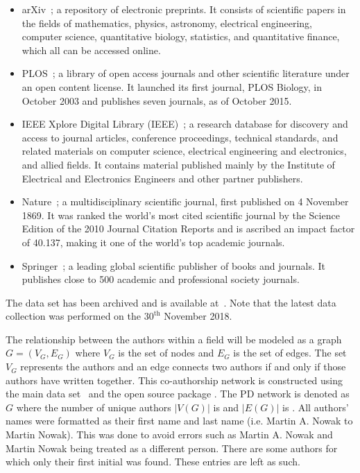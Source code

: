 \documentclass{article}
\theoremstyle{definition}
\newcommand{\authors}{}
\newcommand{\edges}{}
\begin{document}
\begin{multicols}{2}
    \begin{itemize}
        \item arXiv~\cite{mckiernan2000}; a repository of electronic preprints.
        It consists of scientific
        papers in the fields of mathematics, physics, astronomy, electrical engineering,
        computer science, quantitative biology, statistics, and quantitative finance,
        which all can be accessed online.
        \item PLOS~\cite{plos}; a library of open access journals and other scientific literature
        under an open content license. It launched its first journal, PLOS Biology,
        in October 2003 and publishes seven journals, as of October 2015.
        \item IEEE Xplore Digital Library (IEEE)~\cite{ieee}; a research database for discovery
        and access to journal articles, conference proceedings, technical standards,
        and related materials on computer science, electrical engineering and electronics,
        and allied fields. It contains material published mainly by the Institute of
        Electrical and Electronics Engineers and other partner publishers. 
        \item Nature~\cite{nature}; a multidisciplinary scientific journal,
        first published on 4 November 1869. It was ranked the world's most cited
        scientific journal by the Science Edition of the 2010 Journal Citation Reports
        and is ascribed an impact factor of 40.137, making it one of the world's
        top academic journals.
        \item Springer~\cite{springer}; a leading global scientific publisher of
        books and journals. It publishes close to 500 academic and professional
        society journals.
    \end{itemize}
\end{multicols}

The data set has been archived and is available at~\cite{pd_data_2018}. Note that the latest data
collection was performed on the \(30^{\text{th}}\) November 2018.

The relationship between the authors within a field will be modeled as a graph
\(G = (V_G, E_G)\) where \(V_G\) is the set of nodes and \(E_G\)  is the set of
edges. The set \(V_G\) represents the authors and an edge connects two authors
if and only if those authors have written together. This co-authorship network is
constructed using the main data set~\cite{pd_data_2018} and the open source package
\cite{networkx}. The PD network is denoted as \(G\) where the
number of unique authors \(|V(G)|\) is \authors and \(|E(G)|\) is \edges.
All authors' names were formatted as their first name and last name (i.e.
Martin A. Nowak to Martin Nowak). This was done to avoid errors such as Martin
A. Nowak and Martin Nowak being treated as a different person. There are some
authors for which only their first initial was found. These entries are left as
such.
\end{document}
